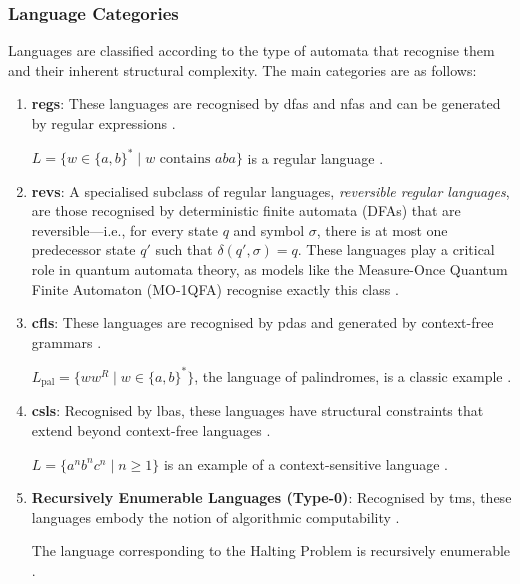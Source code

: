 \subsubsection{Language Categories}
Languages are classified according to the type of automata that recognise them and their inherent structural complexity. The main categories are as follows:

\begin{enumerate}
    \item \textbf{\glspl{reg}}:  
    These languages are recognised by \glspl{dfa} and \glspl{nfa} and can be generated by regular expressions \cite{sipser2013introduction}. 
    \begin{example}
    $L = \{w \in \{a, b\}^\ast \mid w \text{ contains } aba\}$ is a regular language \cite{sipser2013introduction}.
    \end{example}

    \item \textbf{\glspl{rev}}:
    A specialised subclass of regular languages, \textit{reversible regular languages}, are those recognised by deterministic finite automata (DFAs) that are reversible—i.e., for every state \( q \) and symbol \( \sigma \), there is at most one predecessor state \( q' \) such that \( \delta(q', \sigma) = q \). These languages play a critical role in quantum automata theory, as models like the Measure-Once Quantum Finite Automaton (MO-1QFA) recognise exactly this class \cite{kondacs1997power}.
    
    \item \textbf{\glspl{cfl}}:  
    These languages are recognised by \glspl{pda} and generated by context-free grammars \cite{chomsky1956three, sipser2013introduction}.  
    \begin{example}
    $L_{\text{pal}} = \{ww^R \mid w \in \{a, b\}^\ast\}$, the language of palindromes, is a classic example \cite{chomsky1956three}.
    \end{example}

    \item \textbf{\glspl{csl}}:  
    Recognised by \glspl{lba}, these languages have structural constraints that extend beyond context-free languages \cite{chomsky1956three, sipser2013introduction}.  
    \begin{example}
    $L = \{a^n b^n c^n \mid n \geq 1\}$ is an example of a context-sensitive language \cite{chomsky1956three}.
    \end{example}

    \item \textbf{Recursively Enumerable Languages (Type-0)}:  
    Recognised by \glspl{tm}, these languages embody the notion of algorithmic computability \cite{sipser2013introduction, turing1936computable}.  
    \begin{example}
    The language corresponding to the Halting Problem is recursively enumerable \cite{sipser2013introduction}.
    \end{example}


\end{enumerate}
